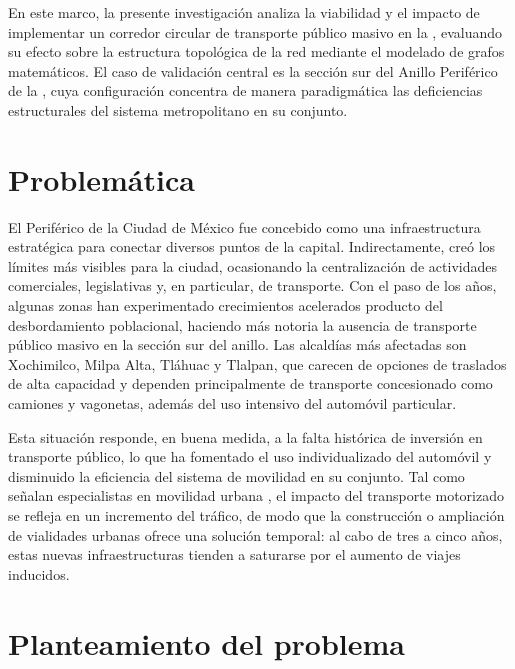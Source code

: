 En este marco, la presente investigación analiza la viabilidad y el impacto de
implementar un corredor circular de transporte público masivo en la \zmvm{},
evaluando su efecto sobre la estructura topológica de la red mediante el modelado
de grafos matemáticos. El caso de validación central es la sección sur del Anillo
Periférico de la \cdmx{}, cuya configuración concentra de manera paradigmática
las deficiencias estructurales del sistema metropolitano en su conjunto.

\section{Problemática}
\label{sec:problematica}

El Periférico de la Ciudad de México fue concebido como una infraestructura
estratégica para conectar diversos puntos de la capital. Indirectamente, creó los
límites más visibles para la ciudad, ocasionando la centralización de actividades
comerciales, legislativas y, en particular, de transporte. Con el paso de los años,
algunas zonas han experimentado crecimientos acelerados producto del
desbordamiento poblacional, haciendo más notoria la ausencia de transporte público
masivo en la sección sur del anillo. Las alcaldías más afectadas son Xochimilco,
Milpa Alta, Tláhuac y Tlalpan, que carecen de opciones de traslados de alta
capacidad y dependen principalmente de transporte concesionado como camiones
y vagonetas, además del uso intensivo del automóvil particular.

Esta situación responde, en buena medida, a la falta histórica de inversión en
transporte público, lo que ha fomentado el uso individualizado del automóvil y
disminuido la eficiencia del sistema de movilidad en su conjunto. Tal como señalan
especialistas en movilidad urbana \parencite{cano2002}, el impacto del transporte
motorizado se refleja en un incremento del tráfico, de modo que la construcción o
ampliación de vialidades urbanas \DIFdelbegin {}\DIFdelend \DIFaddbegin {}\DIFaddend ofrece una solución temporal: al cabo de tres
a cinco años, estas nuevas infraestructuras tienden a saturarse por el aumento de
viajes inducidos.

\section{Planteamiento del problema}
\label{sec:planteamiento}

